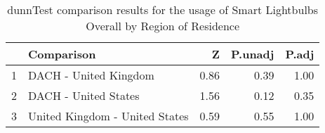\begin{table}[ht]
\centering
\begin{tabular}{rlrrr}
  \hline
 & Comparison & Z & P.unadj & P.adj \\ 
  \hline
1 & DACH - United Kingdom & 0.86 & 0.39 & 1.00 \\ 
  2 & DACH - United States & 1.56 & 0.12 & 0.35 \\ 
  3 & United Kingdom - United States & 0.59 & 0.55 & 1.00 \\ 
   \hline
\end{tabular}
\caption{dunnTest comparison results for the usage of Smart Lightbulbs Overall by Region of Residence} 
\end{table}
